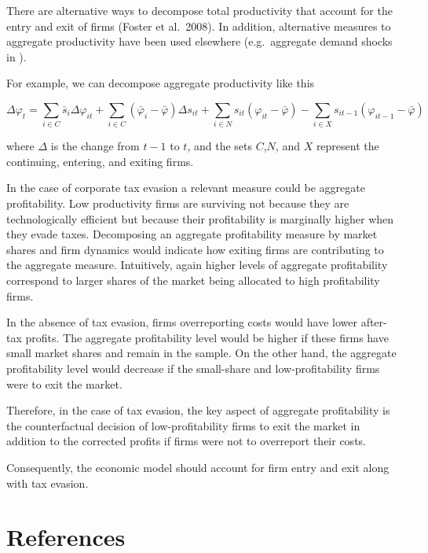 \documentclass[
  12pt]{article}
\theoremstyle{definition}
\theoremstyle{remark}
\begin{document}
There are alternative ways to decompose total productivity that account
for the entry and exit of firms (Foster et al.~2008). In addition,
alternative measures to aggregate productivity have been used elsewhere
(e.g.~aggregate demand shocks in \citet{Eslava2004}).

For example, we can decompose aggregate productivity like this

\[
\Delta\varphi_t = \sum_{i \in C}\bar s_i \Delta\varphi_{it} + \sum_{i\in C}(\bar\varphi_i-\bar\varphi)\Delta s_{it}+\sum_{i\in N} s_{it}\left(\varphi_{it}-\bar\varphi\right)-\sum_{i\in X}s_{it-1}\left(\varphi_{it-1}-\bar \varphi\right)
\]

where \(\Delta\) is the change from \(t-1\) to \(t\), and the sets
\(C\),\(N\), and \(X\) represent the continuing, entering, and exiting
firms.

In the case of corporate tax evasion a relevant measure could be
aggregate profitability. Low productivity firms are surviving not
because they are technologically efficient but because their
profitability is marginally higher when they evade taxes. Decomposing an
aggregate profitability measure by market shares and firm dynamics would
indicate how exiting firms are contributing to the aggregate measure.
Intuitively, again higher levels of aggregate profitability correspond
to larger shares of the market being allocated to high profitability
firms.

In the absence of tax evasion, firms overreporting costs would have
lower after-tax profits. The aggregate profitability level would be
higher if these firms have small market shares and remain in the sample.
On the other hand, the aggregate profitability level would decrease if
the small-share and low-profitability firms were to exit the market.

Therefore, in the case of tax evasion, the key aspect of aggregate
profitability is the counterfactual decision of low-profitability firms
to exit the market in addition to the corrected profits if firms were
not to overreport their costs.

Consequently, the economic model should account for firm entry and exit
along with tax evasion.

\section{References}\label{references}

\renewcommand{\bibsection}{}

\end{document}
